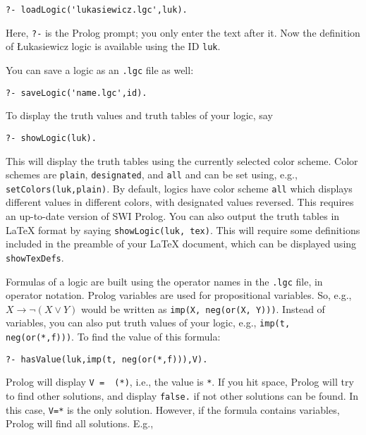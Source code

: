 \documentclass[
]{article}
\newcommand{\passthrough}[1]{#1}
\begin{document}
\begin{lstlisting}
?- loadLogic('lukasiewicz.lgc',luk).
\end{lstlisting}

Here, \passthrough{\lstinline!?-!} is the Prolog prompt; you only enter
the text after it. Now the definition of Łukasiewicz logic is available
using the ID \passthrough{\lstinline!luk!}.

You can save a logic as an \passthrough{\lstinline!.lgc!} file as well:

\begin{lstlisting}
?- saveLogic('name.lgc',id).
\end{lstlisting}

To display the truth values and truth tables of your logic, say

\begin{lstlisting}
?- showLogic(luk).
\end{lstlisting}

This will display the truth tables using the currently selected color
scheme. Color schemes are \passthrough{\lstinline!plain!},
\passthrough{\lstinline!designated!}, and \passthrough{\lstinline!all!}
and can be set using, e.g.,
\passthrough{\lstinline!setColors(luk,plain)!}. By default, logics have
color scheme \passthrough{\lstinline!all!} which displays different
values in different colors, with designated values reversed. This
requires an up-to-date version of SWI Prolog. You can also output the
truth tables in LaTeX format by saying
\passthrough{\lstinline!showLogic(luk, tex)!}. This will require some
definitions included in the preamble of your LaTeX document, which can
be displayed using \passthrough{\lstinline!showTexDefs!}.

Formulas of a logic are built using the operator names in the
\passthrough{\lstinline!.lgc!} file, in operator notation. Prolog
variables are used for propositional variables. So, e.g.,
\(X \to \lnot(X \lor Y)\) would be written as
\passthrough{\lstinline!imp(X, neg(or(X, Y)))!}. Instead of variables,
you can also put truth values of your logic, e.g.,
\passthrough{\lstinline!imp(t, neg(or(*,f)))!}. To find the value of
this formula:

\begin{lstlisting}
?- hasValue(luk,imp(t, neg(or(*,f))),V).
\end{lstlisting}

Prolog will display \passthrough{\lstinline!V =  (*)!}, i.e., the value
is \passthrough{\lstinline!*!}. If you hit space, Prolog will try to
find other solutions, and display \passthrough{\lstinline!false.!} if
not other solutions can be found. In this case,
\passthrough{\lstinline!V=*!} is the only solution. However, if the
formula contains variables, Prolog will find all solutions. E.g.,
\end{document}
